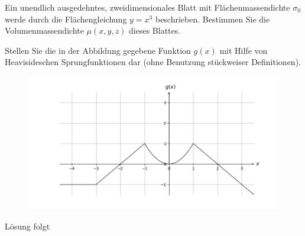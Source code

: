 \documentclass{atistandalonetask}
\begin{document}
  \begin{atiTask}[
    title = Heaviside-Funktion und Delta-Distribution
  ]
\begin{atiSubtasks}
\item Ein unendlich ausgedehntes, zweidimensionales Blatt mit Flächenmassendichte $\sigma_0$ werde durch die Flächengleichung $y=x^3$ beschrieben. Bestimmen Sie die Volumenmassendichte $\mu(x,y,z)$ dieses Blattes. 

\item Stellen Sie die in der Abbildung gegebene Funktion $g(x)$ mit Hilfe von Heavisideschen Sprungfunktionen dar (ohne Benutzung stückweiser Definitionen).  
  \begin{figure}[H]
\centering
\includegraphics[width=0.8\linewidth]{./picture-heaviside_iib}

\end{figure}
\end{atiSubtasks}
  	
  \end{atiTask}
  \begin{atiSolution}
   	Lösung folgt
  \end{atiSolution}
\end{document}
